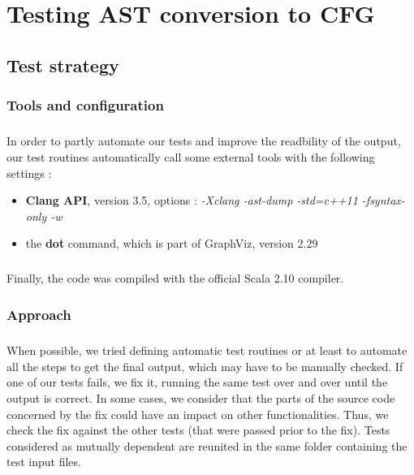\documentclass{report}
\begin{document}
\paragraph{}
\hspace{4mm}

\chapter{Testing AST conversion to CFG}

\section{Test strategy}

\subsection{Tools and configuration}

\paragraph{}
\hspace{4mm}In order to partly automate our tests and improve the readbility of the output, our test routines automatically call some external tools with the following settings :

\vspace{1.5mm}
\begin{itemize}
\item \textbf{Clang API}, version 3.5, options : \textit{-Xclang -ast-dump -std=c++11 -fsyntax-only -w}\vspace{1mm}
\item the \textbf{dot} command, which is part of GraphViz, version 2.29\vspace{1mm}
\end{itemize}

\paragraph{}
\hspace{4mm}Finally, the code was compiled with the official Scala 2.10 compiler.

\subsection{Approach}

\paragraph{}
\hspace{4mm}When possible, we tried defining automatic test routines or at least to automate all the steps to get the final output, which may have to be manually checked.
If one of our tests fails, we fix it, running the same test over and over until the output is correct.
In some cases, we consider that the parts of the source code concerned by the fix could have an impact on other functionalities. Thus, we check the fix against the other
tests (that were passed prior to the fix). Tests considered as mutually dependent are reunited in the same folder containing the test input files.
\end{document}
